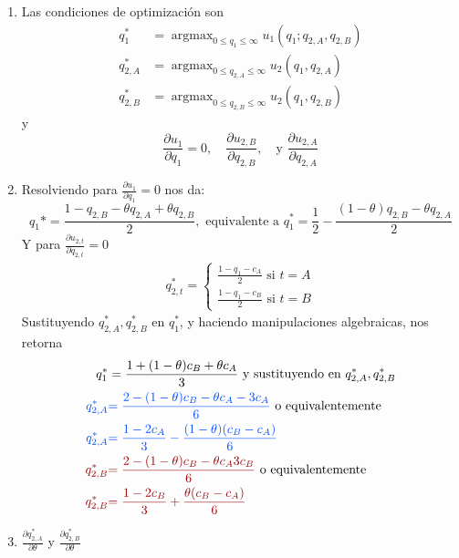 \documentclass[12pt]{scrartcl} %
\DeclareMathOperator*{\argmax}{argmax}
\begin{document}
\begin{Exercise}[name={Respuesta}]
  \begin{enumerate}
    \item   Las condiciones de optimización son
    \begin{align*}
      q_1^*    & = \argmax_{0\leq q_1 \leq \infty} u_1(q_1; q_{2,A}, q_{2,B}) \\
      q_{2,A}^* & = \argmax_{0\leq q_{2,A} \leq \infty} u_2(q_1, q_{2,A})      \\
      q_{2,B}^* & = \argmax_{0\leq q_{2,B} \leq \infty} u_2(q_1, q_{2,B})
    \end{align*}
    y 
    \[\frac{\partial u_1}{\partial q_1}=0,\quad \frac{\partial u_{2,B}}{\partial q_{2,B}},\quad \text{y } \frac{\partial u_{2,A}}{\partial q_{2,A}} \]
    \item Resolviendo para $ \frac{\partial u_1}{\partial q_1}=0 $ nos da:
    \[q_1* = \frac{1 - q_{2,B}- \theta q_{2,A} + \theta q_{2,B}}{2}, \text{ equivalente a } q_1^* = \frac{1}{2} - \frac{(1-\theta)q_{2,B}-  \theta q_{2,A}}{2}\]
    Y para $ \frac{\partial u_{2,t}}{\partial q_{2,t}}=0 $
    \begin{align*}
      q_{2,t}^* =%
      \begin{cases}
        \frac{1-q_1-c_A}{2} \text{ si } t = A\\
        \frac{1-q_1-c_B}{2} \text{ si } t = B
      \end{cases}
    \end{align*}
    Sustituyendo $ q_{2,A}^*, q_{2,B}^*$ en $ q_1^* $, y haciendo manipulaciones algebraicas, nos retorna
    \begin{align*}
      q_1^* &= \frac{1+(1-\theta)c_B + \theta c_A}{3} \text{ y sustituyendo en } q_{2,A}^*, q_{2,B}^*\\
      \color{blue!70!cyan}q_{2,A}^* &{\color{blue!70!cyan}= \frac{2-(1-\theta)c_B - \theta c_A - 3 c_A}{6}} \text{ o equivalentemente}\\
      \color{blue!70!cyan}q_{2,A}^* &{\color{blue!70!cyan}= \frac{1-2c_A}{3} - \frac{(1-\theta)(c_B-c_A)}{6}} \\
      \color{red!60!black}q_{2,B}^* &{\color{red!60!black}= \frac{2-(1-\theta)c_B - \theta c_A  3c_B}{6}} \text{ o equivalentemente}\\
      \color{red!60!black}q_{2,B}^* & {\color{red!60!black} = \frac{1-2c_B}{3} + \frac{\theta(c_B-c_A)}{6}}
    \end{align*}
    \item $ \frac{\partial q_{2,A}^*}{\partial \theta} $ y $ \frac{\partial q_{2,B}^*}{\partial \theta}  $
    \begin{align*}

\end{align*}
\end{enumerate}
\end{Exercise}
\end{document}
